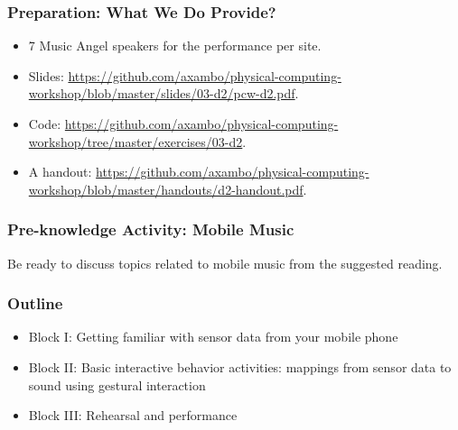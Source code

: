 \documentclass[screen, aspectratio=43]{beamer}
\begin{document}
%
\begin{frame}
  \frametitle{Preparation: What We Do Provide?}
        \begin{itemize}
        \item 7 Music Angel speakers for the performance per site.
        \item Slides: \url{https://github.com/axambo/physical-computing-workshop/blob/master/slides/03-d2/pcw-d2.pdf}.
        \item Code: \url{https://github.com/axambo/physical-computing-workshop/tree/master/exercises/03-d2}.
        \item A handout: \url{https://github.com/axambo/physical-computing-workshop/blob/master/handouts/d2-handout.pdf}.        
         \end{itemize}
\end{frame}
%
\begin{frame}
  \frametitle{Pre-knowledge Activity: Mobile Music}
  Be ready to discuss topics related to mobile music from the suggested reading.
\end{frame}
%
\begin{frame}
  \frametitle{Outline}
      \begin{itemize}
	\item Block I: Getting familiar with sensor data from your mobile phone
	\item Block II: Basic interactive behavior activities: mappings from sensor data to sound using gestural interaction
	\item Block III: Rehearsal and performance
    \end{itemize}  
\end{frame}
%
\end{document}
